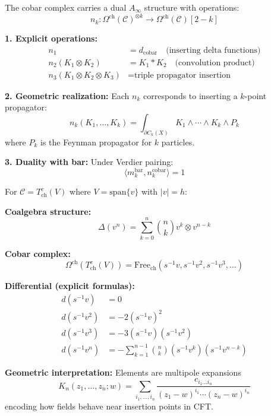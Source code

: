 \begin{theorem}
The cobar complex carries a dual $A_\infty$ structure with operations:
$$n_k: \Omega^{\text{ch}}(\mathcal{C})^{\otimes k} \to \Omega^{\text{ch}}(\mathcal{C})[2-k]$$

\textbf{1. Explicit operations:}
\begin{align}
n_1 &= d_{\text{cobar}} \quad \text{(inserting delta functions)} \\
n_2(K_1 \otimes K_2) &= K_1 * K_2 \quad \text{(convolution product)} \\
n_3(K_1 \otimes K_2 \otimes K_3) &= \text{triple propagator insertion}
\end{align}

\textbf{2. Geometric realization:} Each $n_k$ corresponds to inserting a $k$-point propagator:
$$n_k(K_1, \ldots, K_k) = \int_{\partial C_k(X)} K_1 \wedge \cdots \wedge K_k \wedge P_k$$
where $P_k$ is the Feynman propagator for $k$ particles.

\textbf{3. Duality with bar:} Under Verdier pairing:
$$\langle m_k^{\text{bar}}, n_k^{\text{cobar}} \rangle = 1$$
\end{theorem}

\begin{example}
For $\mathcal{C} = T^c_{\text{ch}}(V)$ where $V = \text{span}\{v\}$ with $|v| = h$:

\textbf{Coalgebra structure:}
$$\Delta(v^n) = \sum_{k=0}^n \binom{n}{k} v^k \otimes v^{n-k}$$

\textbf{Cobar complex:}
$$\Omega^{\text{ch}}(T^c_{\text{ch}}(V)) = \text{Free}_{\text{ch}}(s^{-1}v, s^{-1}v^2, s^{-1}v^3, \ldots)$$

\textbf{Differential (explicit formulas):}
\begin{align}
d(s^{-1}v) &= 0 \\
d(s^{-1}v^2) &= -2(s^{-1}v)^2 \\
d(s^{-1}v^3) &= -3(s^{-1}v)(s^{-1}v^2) \\
d(s^{-1}v^n) &= -\sum_{k=1}^{n-1} \binom{n}{k}(s^{-1}v^k)(s^{-1}v^{n-k})
\end{align}

\textbf{Geometric interpretation:} Elements are multipole expansions
$$K_n(z_1, \ldots, z_n; w) = \sum_{i_1, \ldots, i_n} \frac{c_{i_1\ldots i_n}}{(z_1 - w)^{i_1} \cdots (z_n - w)^{i_n}}$$
encoding how fields behave near insertion points in CFT.
\end{example}

